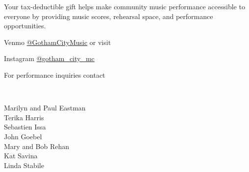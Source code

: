 \documentclass{article}[10pt]
\begin{document}
\begin{center}
\begin{minipage}{4in}
            \begin{center}
            {\textbf{}}
            \end{center}

            \vspace{-0.1in}

            \begin{small}
                Your tax-deductible gift helps make community music performance accessible to everyone by providing music scores, rehearsal space, and performance opportunities.\\
            \end{small}


            Venmo \href{https://account.venmo.com/u/GothamCityMusic}{@GothamCityMusic} or visit \textbf{}

            \begin{center}
            {\textbf{}}

                \faInstagram{}{}  Instagram  \href{https://www.instagram.com/gotham_city_mc/}{@gotham\_city\_mc}


                For performance inquiries contact
                    {\textbf{}}
            \end{center}

            \begin{center}
            {\textbf{}}
                \\

                \begin{small}
                    \vspace{-0.11in}
                    \begin{multicols*}{2}
                        Marilyn and Paul Eastman\\
                        Terika Harris\\
                        Sebastien Issa\\
                        John Goebel\\
                        Mary and Bob Rehan\\
                        Kat Savina\\
                        Linda Stabile
                    \end{multicols*}
                \end{small}
            \end{center}

        \end{minipage}

    \end{center}
\end{document}
